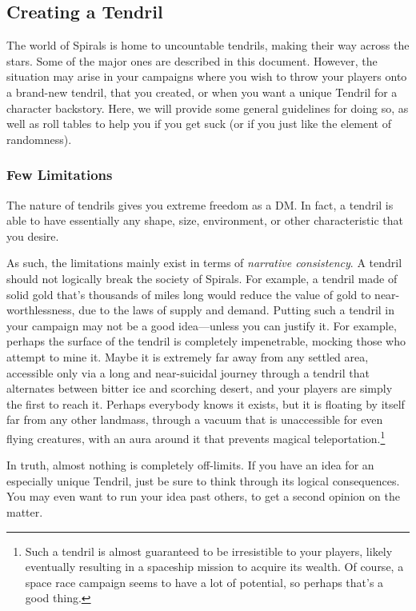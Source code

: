 \begin{multicols*}{2}
\section{Creating a Tendril}
The world of Spirals is home to uncountable tendrils, making their way across the stars.
Some of the major ones are described in this document.
However, the situation may arise in your campaigns where you wish to throw your players onto a brand-new tendril, that you created, or when you want a unique Tendril for a character backstory.
Here, we will provide some general guidelines for doing so, as well as roll tables to help you if you get suck (or if you just like the element of randomness).

\subsubsection*{Few Limitations}
The nature of tendrils gives you extreme freedom as a DM.
In fact, a tendril is able to have essentially any shape, size, environment, or other characteristic that you desire.

As such, the limitations mainly exist in terms of \textit{narrative consistency}.
A tendril should not logically break the society of Spirals.
For example, a tendril made of solid gold that's thousands of miles long would reduce the value of gold to near-worthlessness, due to the laws of supply and demand.
Putting such a tendril in your campaign may not be a good idea---unless you can justify it.
For example, perhaps the surface of the tendril is completely impenetrable, mocking those who attempt to mine it.
Maybe it is extremely far away from any settled area, accessible only via a long and near-suicidal journey through a tendril that alternates between bitter ice and scorching desert, and your players are simply the first to reach it.
Perhaps everybody knows it exists, but it is floating by itself far from any other landmass, through a vacuum that is unaccessible for even flying creatures, with an aura around it that prevents magical teleportation.\footnote{Such a tendril is almost guaranteed to be irresistible to your players, likely eventually resulting in a spaceship mission to acquire its wealth. Of course, a space race campaign seems to have a lot of potential, so perhaps that's a good thing.}

In truth, almost nothing is completely off-limits.
If you have an idea for an especially unique Tendril, just be sure to think through its logical consequences.
You may even want to run your idea past others, to get a second opinion on the matter.



\end{multicols*}
